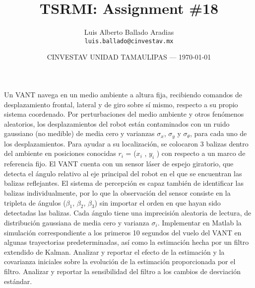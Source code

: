 \documentclass{article}
\title{TSRMI: Assignment \#18} %
\author{Luis Alberto Ballado Aradias\\ \texttt{luis.ballado@cinvestav.mx}} %
\date{CINVESTAV UNIDAD TAMAULIPAS --- \today} %
\begin{document}
\maketitle %


Un VANT navega en un medio ambiente a altura fija, recibiendo comandos de desplazamiento frontal, lateral y de giro sobre sí mismo, respecto a su propio sistema coordenado. Por perturbaciones del medio ambiente y otros fenómenos aleatorios, los desplazamientos del robot están contaminados con un ruido gaussiano (no medible) de media cero y varianzas $\sigma_{x}$, $\sigma_{y}$ y $\sigma_{\theta}$, para cada uno de los desplazamientos. Para ayudar a su localización, se colocaron 3 balizas dentro del ambiente en posiciones conocidas $r_{i}$ = ($x_{i}$ , $y_{i}$ ) con respecto a un marco de referencia fijo. El VANT cuenta con un sensor láser de espejo giratorio, que detecta el ángulo relativo al eje principal del robot en el que se encuentran las balizas reflejantes. El sistema de percepción es capaz también de identificar las balizas individualmente, por lo que la observación del sensor consiste en la tripleta de ángulos ($\beta_{1}$, $\beta_{2}$, $\beta_{3}$) sin importar el orden en que hayan sido detectadas las balizas. Cada ángulo tiene una imprecisión aleatoria de lectura, de distribución gaussiana de media cero y varianza $\sigma_{i}$. Implementar en Matlab la simulación correspondiente a los primeros 10 segundos del vuelo del VANT en algunas trayectorias predeterminadas, así como la estimación hecha por un filtro extendido de Kalman. Analizar y reportar el efecto de la estimación y la covarianza iniciales sobre la evolución de la estimación proporcionada por el filtro. Analizar y reportar la sensibilidad del filtro a los cambios de desviación estándar.
\end{document}
